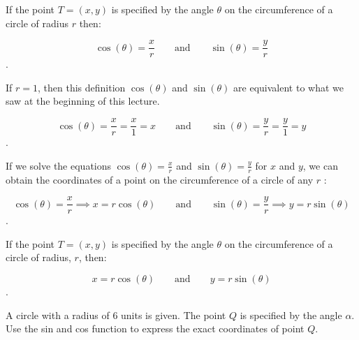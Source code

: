 \begin{definition}
  \label{def:more_applicable_version_of_sin_and_cos}
  If the point $T = (x, y)$ is specified by the angle $\theta$ on the
  circumference of a circle of radius $r$ then:

  \[ \cos (\theta) = \frac{x}{r} \qquad \textrm{and} \qquad \sin (\theta) = \frac{y}{r} \].

  \begin{note}
    \label{nte:more_applicable_version_of_sin_and_cos}

    If $r = 1$, then this definition $\cos (\theta)$ and $\sin (\theta)$ are
    equivalent to what we saw at the beginning of this lecture.

    \[ \cos (\theta) = \frac{x}{r} = \frac{x}{1} = x \qquad \textrm{and} \qquad \sin (\theta) = \frac{y}{r} = \frac{y}{1} = y \].
  \end{note}

  If we solve the equations $\cos (\theta) = \frac{x}{r}$ and $\sin (\theta) =
  \frac{y}{r}$ for $x$ and $y$, we can obtain the coordinates of a point on the
  circumference of a circle of any $r$ :

  \[ \cos (\theta) = \frac{x}{r} \implies x = r \cos (\theta) \qquad \textrm{and} \qquad \sin (\theta) = \frac{y}{r} \implies y = r \sin (\theta) \].

  If the point $T = (x, y)$ is specified by the angle $\theta$ on the
  circumference of a circle of radius, $r$, then:

  \[ x = r \cos (\theta) \qquad \textrm{and} \qquad y = r \sin(\theta) \].
\end{definition}

\begin{exc}
  \label{exc:using_r_cos_and_r_sin}

  A circle with a radius of $6$ units is given. The point $Q$ is specified by
  the angle $\alpha$. Use the sin and cos function to express the exact
  coordinates of point $Q$.

  \begin{figure}[H]
    \centering


    \caption{}
    \label{fig:circle_with_radius_of_6_units}
  \end{figure}
\end{exc}

